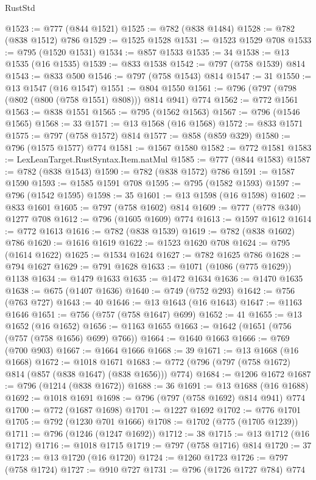 \begin{lexlean}{RustStd}
\begin{coremodule}
@1523 := @777 (@844 @1521)
@1525 := @782 (@838 @1484)
@1528 := @782 (@838 @1512) @786
@1529 := @1525 @1528
@1531 := @1523 @1529 @708
@1533 := @795 (@1520 @1531)
@1534 := @857 @1533
@1535 := 34
@1538 := @13 @1535 (@16 @1535)
@1539 := @833 @1538
@1542 := @797 (@758 @1539) @814
@1543 := @833 @500
@1546 := @797 (@758 @1543) @814
@1547 := 31
@1550 := @13 @1547 (@16 @1547)
@1551 := @804 @1550
@1561 := @796 (@797 (@798 (@802 (@800 (@758 @1551) @808))) @814 @941) @774
@1562 := @772 @1561
@1563 := @838 @1551
@1565 := @795 (@1562 @1563)
@1567 := @796 (@1546 @1565)
@1568 := 33
@1571 := @13 @1568 (@16 @1568)
@1572 := @833 @1571
@1575 := @797 (@758 @1572) @814
@1577 := @858 (@859 @329)
@1580 := @796 (@1575 @1577) @774
@1581 := @1567 @1580
@1582 := @772 @1581
@1583 := LexLeanTarget.RustSyntax.Item.natMul
@1585 := @777 (@844 @1583)
@1587 := @782 (@838 @1543)
@1590 := @782 (@838 @1572) @786
@1591 := @1587 @1590
@1593 := @1585 @1591 @708
@1595 := @795 (@1582 @1593)
@1597 := @796 (@1542 @1595)
@1598 := 35
@1601 := @13 @1598 (@16 @1598)
@1602 := @833 @1601
@1605 := @797 (@758 @1602) @814
@1609 := @777 (@778 @340) @1277 @708
@1612 := @796 (@1605 @1609) @774
@1613 := @1597 @1612
@1614 := @772 @1613
@1616 := @782 (@838 @1539)
@1619 := @782 (@838 @1602) @786
@1620 := @1616 @1619
@1622 := @1523 @1620 @708
@1624 := @795 (@1614 @1622)
@1625 := @1534 @1624
@1627 := @782 @1625 @786
@1628 := @794 @1627
@1629 := @791 @1628
@1633 := @1071 (@1086 (@775 @1629)) @1138
@1634 := @1479 @1633
@1635 := @1472 @1634
@1636 := @1470 @1635
@1638 := @675 (@1407 @1636)
@1640 := @749 (@752 @293)
@1642 := @756 (@763 @727)
@1643 := 40
@1646 := @13 @1643 (@16 @1643)
@1647 := @1163 @1646
@1651 := @756 (@757 (@758 @1647) @699)
@1652 := 41
@1655 := @13 @1652 (@16 @1652)
@1656 := @1163 @1655
@1663 := @1642 (@1651 (@756 (@757 (@758 @1656) @699) @766))
@1664 := @1640 @1663
@1666 := @769 (@700 @903)
@1667 := @1664 @1666
@1668 := 39
@1671 := @13 @1668 (@16 @1668)
@1672 := @1018 @1671
@1683 := @772 (@796 (@797 (@758 @1672) @814 (@857 (@838 @1647) (@838 @1656))) @774)
@1684 := @1206 @1672
@1687 := @796 (@1214 (@838 @1672))
@1688 := 36
@1691 := @13 @1688 (@16 @1688)
@1692 := @1018 @1691
@1698 := @796 (@797 (@758 @1692) @814 @941) @774
@1700 := @772 (@1687 @1698)
@1701 := @1227 @1692
@1702 := @776 @1701
@1705 := @792 (@1230 @701 @1666)
@1708 := @1702 (@775 (@1705 @1239))
@1711 := @796 (@1246 (@1247 @1692))
@1712 := 38
@1715 := @13 @1712 (@16 @1712)
@1716 := @1018 @1715
@1719 := @797 (@758 @1716) @814
@1720 := 37
@1723 := @13 @1720 (@16 @1720)
@1724 := @1260 @1723
@1726 := @797 (@758 @1724)
@1727 := @910 @727
@1731 := @796 (@1726 @1727 @784) @774

\end{coremodule}
\end{lexlean}
